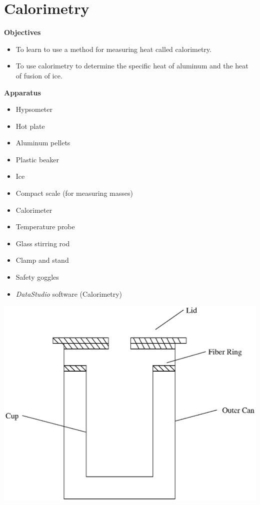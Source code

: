 \section{Calorimetry}

\makelabheader %

\bigskip
\textbf{Objectives}
\begin{itemize}[nosep]%
\item To learn to use a method for measuring heat called calorimetry.
\item To use calorimetry to determine the specific heat of aluminum and
the heat of fusion of ice.
\end{itemize}

\begin{minipage}{0.39\textwidth}

\bigskip
\textbf{Apparatus}
\begin{itemize}[itemsep=1pt]%
\item Hypsometer
\item Hot plate 
\item Aluminum pellets 
\item Plastic beaker
\item Ice 
\item Compact scale (for measuring masses)
\item Calorimeter
\item Temperature probe
\item Glass stirring rod
\item Clamp and stand
\item Safety goggles
\item \textit{DataStudio} software (Calorimetry)
\end{itemize}
\end{minipage}
\begin{minipage}{0.60\textwidth}
\includegraphics[width=\textwidth]{calorimetry/calorimetry_fig_1.eps}
\end{minipage}

